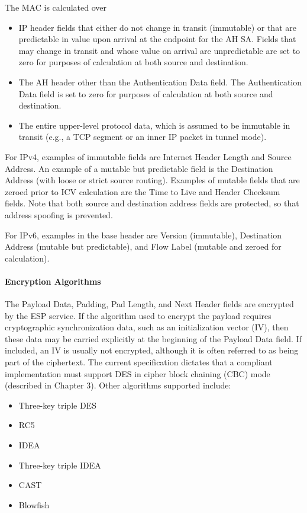 \documentclass[12pt]{article}
\begin{document}
The MAC is calculated over
\begin{itemize}
\item IP header fields that either do not change in transit (immutable) or that are predictable in value upon arrival at the endpoint for the AH SA. Fields that may change in transit and whose value on arrival are unpredictable are set to zero for purposes of calculation at both source and destination.
\item The AH header other than the Authentication Data field. The Authentication Data field is set to zero for purposes of calculation at both source and destination.
\item The entire upper-level protocol data, which is assumed to be immutable in transit (e.g., a TCP segment or an inner IP packet in tunnel mode).
\end{itemize}
For IPv4, examples of immutable fields are Internet Header Length and Source Address. An example of a mutable but predictable field is the Destination Address (with loose or strict source routing). Examples of mutable fields that are zeroed prior to ICV calculation are the Time to Live and Header Checksum fields. Note that both source and destination address fields are protected, so that address spoofing is prevented.

For IPv6, examples in the base header are Version (immutable), Destination Address (mutable but predictable), and Flow Label (mutable and zeroed for calculation).
\paragraph*{Encryption Algorithms}
The Payload Data, Padding, Pad Length, and Next Header fields are encrypted by the ESP service. If the algorithm used to encrypt the payload requires cryptographic synchronization data, such as an initialization vector (IV), then these data may be carried explicitly at the beginning of the Payload Data field. If included, an IV is usually not encrypted, although it is often referred to as being part of the ciphertext.
The current specification dictates that a compliant implementation must support DES in cipher block chaining (CBC) mode (described in Chapter 3). Other algorithms supported include:
\begin{itemize}
\item Three-key triple DES
\item RC5
\item IDEA
\item Three-key triple IDEA
\item CAST
\item Blowfish
\end{itemize}
\end{document}
